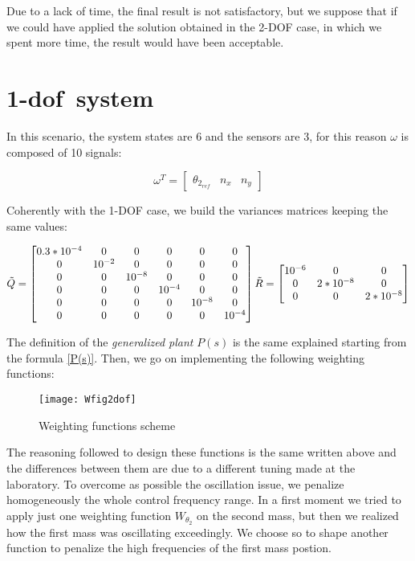 Due to a lack of time, the final result is not satisfactory, but we suppose that if we could have applied the solution obtained in the 2-DOF case, in which we spent more time, the result would have been acceptable.
\newpage
\section{\acrshort{1-dof}\ system}
In this scenario, the system states are 6 and the sensors are 3, for this reason $\omega$ is composed of 10 signals:

\begin{equation}
	\omega^{T} =
	\begin{bmatrix}
		\theta_{2_{ref}} & n_x & n_y
	\end{bmatrix}
\end{equation}

Coherently with the 1-DOF case, we build the variances matrices keeping the same values:

\begin{equation}
	\tilde{Q}=
	\begin{bmatrix}
		0.3*10^{-4} & 0 & 0 & 0 & 0 & 0\\
		0 & 10^{-2} & 0 & 0 & 0 & 0\\
		0 & 0 & 10^{-8} & 0 & 0 & 0 \\
		0 & 0 & 0 & 10^{-4} & 0 & 0 \\
		0 & 0 & 0 & 0 & 10^{-8} & 0 \\
		0 & 0 & 0 & 0 & 0 & 10^{-4}
	\end{bmatrix}
	\\
	\tilde{R}=
	\begin{bmatrix}
		10^{-6} & 0 & 0\\
		0 & 2*10^{-8} & 0 \\
		0 & 0 & 2*10^{-8} 
	\end{bmatrix}	
\end{equation}

The definition of the \textit{generalized plant} $P(s)$ is the same explained starting from the formula \ref{P(s)}. Then, we go on implementing the following weighting functions:

\begin{figure*}[h]
	\centering
	\texttt{[image: Wfig2dof]}
	\caption{Weighting functions scheme}
	\label{Weighting functions scheme2dof}
\end{figure*}

The reasoning followed to design these functions is the same written above and the differences between them are due to a different tuning made at the laboratory. To overcome as possible the oscillation issue, we penalize homogeneously the whole control frequency range. In a first moment we tried to apply just one weighting function $W_{\theta_{2}}$ on the second mass, but then we realized how the first mass was oscillating exceedingly. We choose so to shape another function to penalize the high frequencies of the first mass postion.

